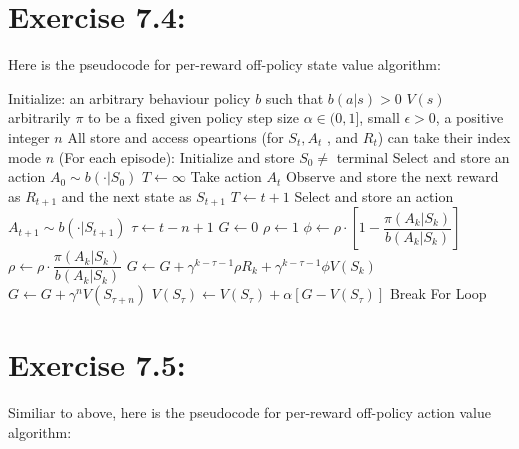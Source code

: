 \documentclass[10pt,letterpaper]{article}
\begin{document}
\section*{Exercise 7.4: }
\label{7.4}

Here is the pseudocode for per-reward off-policy state value algorithm:


\begin{algorithmic}
\State Initialize:
\Indent
\State an arbitrary behaviour policy $b$ such that $ b(a|s)>0$
\State $V(s)$ arbitrarily
\State $\pi$ to be a fixed given policy
\State step size $\alpha \in (0,1]$, small $\epsilon>0$, a positive integer $n$
\EndIndent
\State All store and access opeartions (for $S_t, A_t$ , and $R_t$) can take their index mode $n$
\Repeat (For each episode):
\State Initialize and store $S_0 \neq$ terminal
\State Select and store an action $A_0 \sim b(\cdot|S_0)$
\State $T \gets \infty$
\State Take action $A_t$
\State Observe and store the next reward as $R_{t+1}$ and the next state as $S_{t+1}$
\State $T \gets t + 1$
\Else
\State Select and store an action $A_{t+1} \sim b(\cdot|S_{t+1})$
\EndIf
\EndIf
\State $\tau \gets t-n+1$
\State $G \gets 0$
\State $\rho \gets 1$
\State $\phi \gets \rho \cdot [1-\dfrac{\pi(A_k|S_k)}{b(A_k|S_k)}]$
\State $\rho \gets \rho \cdot \dfrac{\pi(A_k|S_k)}{b(A_k|S_k)}$
\State $G \gets G + \gamma^{k-\tau-1}\rho R_k + \gamma^{k-\tau-1}\phi V(S_k)$
\EndFor
{}
\State $G \gets G + \gamma^nV(S_{\tau+n})$
\EndIf
\State $V(S_\tau) \gets V(S_\tau) + \alpha[G -V(S_\tau)]$
\EndIf
{}
\State Break For Loop
\EndIf
\EndFor
{}
\end{algorithmic}



\section*{Exercise 7.5: }
\label{7.5}

Similiar to above, here is the pseudocode for per-reward off-policy action value algorithm:
\end{document}
